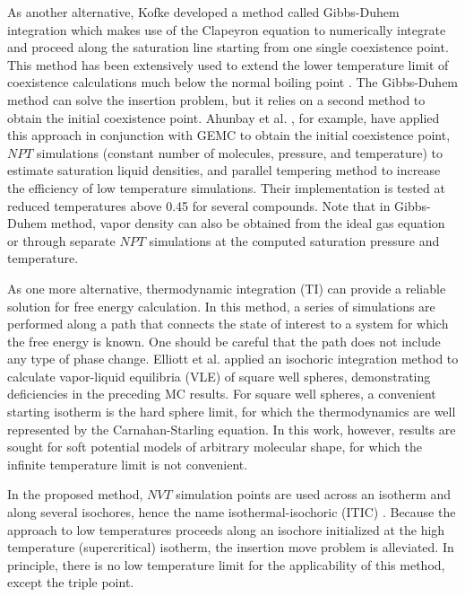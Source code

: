 \documentclass[5p,times]{elsarticle}
\begin{document}
As another alternative, Kofke \cite{Kofke1993b} developed a method called Gibbs-Duhem integration which makes use of the Clapeyron equation to numerically integrate and proceed along the saturation line starting from one single coexistence point. This method has been extensively used to extend the lower temperature limit of coexistence calculations much below the normal boiling point \cite{Ahunbay2004} \cite{Vega2009} \citep{Ungerer2000} \cite{Vega2006} \cite{Yiannourakou2018}. The Gibbs-Duhem method can solve the insertion problem, but it relies on a second method to obtain the initial coexistence point. Ahunbay et al. \cite{Ahunbay2004}, for example, have applied this approach in conjunction with GEMC to obtain the initial coexistence point, $NPT$ simulations (constant number of molecules, pressure, and temperature) to estimate saturation liquid densities, and parallel tempering method \cite{Yan1999} to increase the efficiency of low temperature simulations. Their implementation is tested at reduced temperatures above 0.45 for several compounds. Note that in Gibbs-Duhem method, vapor density can also be obtained from the ideal gas equation or through separate $NPT$ simulations at the computed saturation pressure and temperature.

As one more alternative, thermodynamic integration (TI) can provide a reliable solution for free energy calculation. In this method, a series of simulations are performed along a path that connects the state of interest to a system for which the free energy is known. One should be careful that the path does not include any type of phase change\cite{Vega2009}. Elliott et al. \cite{Elliott1999a} applied an isochoric integration method to calculate vapor-liquid equilibria (VLE) of square well spheres, demonstrating deficiencies in the preceding MC results.  For square well spheres, a convenient starting isotherm is the hard sphere limit, for which the thermodynamics are well represented by the Carnahan-Starling equation\cite{Carnahan1969a}. In this work, however, results are sought for soft potential models of arbitrary molecular shape, for which the infinite temperature limit is not convenient. 

In the proposed method, $NVT$ simulation points are used across an isotherm and along several isochores, hence the name isothermal-isochoric (ITIC) \cite{Razavi2016}. Because the approach to low temperatures proceeds along an isochore initialized at the high temperature (supercritical) isotherm, the insertion move problem is alleviated. In principle, there is no low temperature limit for the applicability of this method, except the triple point. 
\end{document}
